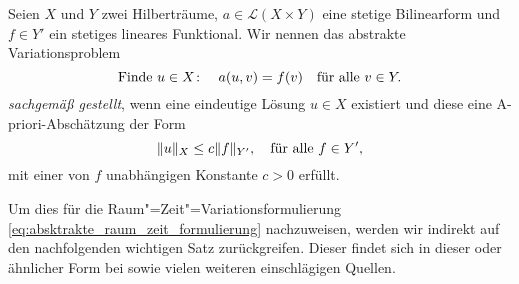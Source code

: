 \begin{Definition}[Hadamard]
\label{definition:sachgemaess_gestellt_nach_hadamard}
    Seien $X$ und $Y$ zwei Hilberträume, $a \in \mathcal L(X \times Y)$ eine stetige Bilinearform und $f \in Y'$ ein stetiges lineares Funktional.
    Wir nennen das abstrakte Variationsproblem
    \begin{equation}
    \label{eq:hadamard_variationsproblem}
        \text{Finde } u \in X \colon \quad a(u, v) = f(v) \quad \fa v \in Y.
    \end{equation}
    \emph{sachgemäß gestellt}, wenn eine eindeutige Lösung $u \in X$ existiert und diese eine A-priori-Abschätzung der Form
    \begin{equation}
    \label{eq:hadamard_abschaetzung}
        \norm{u}_{X} \leq c \norm{f}_{Y'}, \quad \fa f \in Y',
    \end{equation}
    mit einer von $f$ unabhängigen Konstante $c > 0$ erfüllt.
\end{Definition}

Um dies für die Raum"=Zeit"=Variationsformulierung \cref{eq:absktrakte_raum_zeit_formulierung} nachzuweisen, werden wir indirekt auf den nachfolgenden wichtigen Satz zurückgreifen.
Dieser findet sich in dieser oder ähnlicher Form bei \textcites[Theorem 2.1]{Babuska:1971fx}[Theorem 5.2.1]{Aziz:2014wf}[Theorem \S{}3.3.6]{Braess:2007wm} sowie vielen weiteren einschlägigen Quellen.

